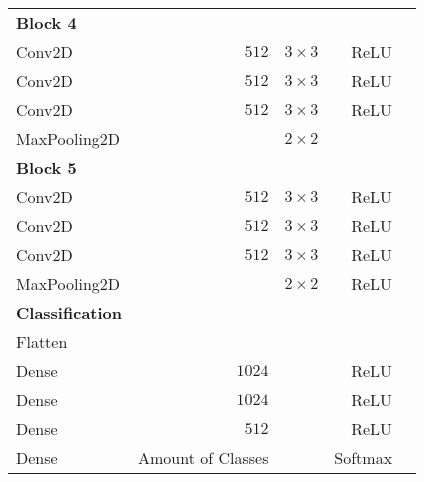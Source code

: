 \begin{table}[H]
\begin{tabular}{lrrrr}
		\textbf{Block 4}        &                           &                           &                                     \\
		\rowcolor{lightGrey}  
		Conv2D                  & $512$                     & $3\times3$                & ReLU                                \\
		Conv2D                  & $512$                     & $3\times3$                & ReLU                                \\
		\rowcolor{lightGrey}  
		Conv2D                  & $512$                     & $3\times3$                & ReLU                                \\
		MaxPooling2D            &             &          $2\times2$                  &                                     \\
		\textbf{Block 5}        &                           &                           &                                    \\
		\rowcolor{lightGrey}  
		Conv2D                  & $512$                     & $3\times3$                & ReLU                                \\
		Conv2D                  & $512$                     & $3\times3$                & ReLU                                \\
		\rowcolor{lightGrey}  
		Conv2D                  & $512$                     & $3\times3$                & ReLU                                \\
		MaxPooling2D            &               &        $2\times2$        & ReLU                                \\
		\textbf{Classification} &                           &                           &                                     \\
		\rowcolor{lightGrey}  
		Flatten                 &                           &                           &                                     \\
		Dense                   & $1024$                    &                           & ReLU                                \\
		\rowcolor{lightGrey}  
		Dense               	& $1024$                    &                           & ReLU                 	           \\
		Dense                   & $512$                    	&                           & ReLU                                \\
		\rowcolor{lightGrey} 
		Dense                   & Amount of Classes         &                           & Softmax                            
	\end{tabular}
\end{table}

